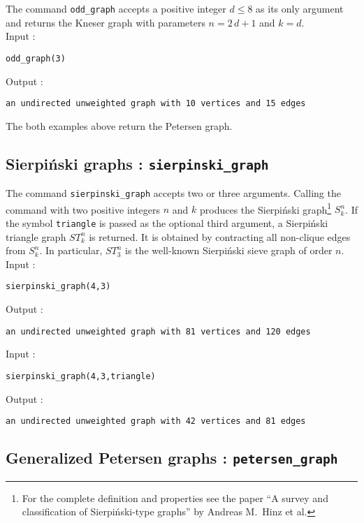 \documentclass[a4paper,11pt]{article}
\begin{document}
The command {\tt odd\_graph} accepts a positive integer $ d\leq 8 $ as its only argument and returns the Kneser graph with parameters $ n=2\,d+1 $ and $ k=d $.\\
Input :
\begin{center}
  \tt odd\_graph(3)
\end{center}
Output :
\begin{center}
  \tt an undirected unweighted graph with 10 vertices and 15 edges
\end{center}
The both examples above return the Petersen graph.

\subsection{Sierpiński graphs : {\tt sierpinski\_graph}}

The command {\tt sierpinski\_graph} accepts two or three arguments. Calling the command with two positive integers $ n $ and $ k $ produces the Sierpiński graph\footnote{For the complete definition and properties see the paper ``A survey and classification of Sierpiński-type
graphs'' by Andreas M.~Hinz et al.} $ S_k^n $. If the symbol {\tt triangle} is passed as the optional third argument, a Sierpiński triangle graph $ ST_k^n $ is returned. It is obtained by contracting all non-clique edges from $ S_k^n $. In particular, $ ST_3^n $ is the well-known Sierpiński sieve graph of order $ n $.\\
Input :
\begin{center}
  \tt sierpinski\_graph(4,3)
\end{center}
Output :
\begin{center}
  \tt an undirected unweighted graph with 81 vertices and 120 edges
\end{center}
Input :
\begin{center}
  \tt sierpinski\_graph(4,3,triangle)
\end{center}
Output :
\begin{center}
  \tt an undirected unweighted graph with 42 vertices and 81 edges
\end{center}

\subsection{Generalized Petersen graphs : {\tt petersen\_graph}}
\end{document}
